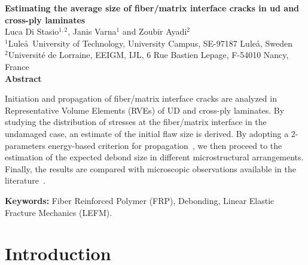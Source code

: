 \thispagestyle{plain}
\begin{center}
\Large\textbf{Estimating the average size of fiber/matrix interface cracks in ud and cross-ply laminates}\\
\vspace{10mm}
\normalsize Luca Di Stasio$^{1,2}$, Janis Varna$^{1}$ and Zoubir Ayadi$^{2}$\\
\vspace{5mm}
\normalsize $^{1}$Lule\aa\ University of Technology, University Campus, SE-97187 Lule\aa, Sweden\\
\normalsize $^{2}$Universit\'e de Lorraine, EEIGM, IJL, 6 Rue Bastien Lepage, F-54010 Nancy, France\\
\vspace{15mm}
\textbf{Abstract}\\
\end{center}

Initiation and propagation of fiber/matrix interface cracks are analyzed in Representative Volume Elements (RVEs) of UD and cross-ply laminates. By studying the distribution of stresses at the fiber/matrix interface in the undamaged case, an estimate of the initial flaw size is derived. By adopting a 2-parameters energy-based criterion for propagation~\cite{Hutchinson1991}, we then proceed to the estimation of the expected debond size in different microstructural arrangements. Finally, the results are compared with microscopic observations available in the literature~\cite{Correa2018}.

\vspace{5mm}

\textbf{Keywords:} Fiber Reinforced Polymer (FRP), Debonding, Linear Elastic Fracture Mechanics (LEFM).

\section{Introduction}

